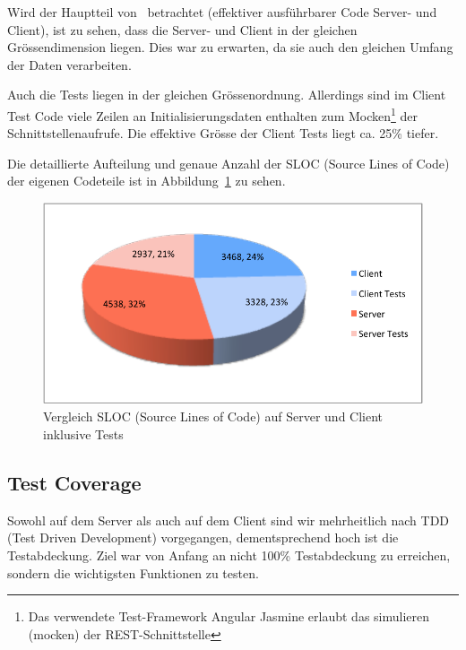 	Wird der Hauptteil von \eeppi\ betrachtet (effektiver ausführbarer Code Server- und Client),
	ist zu sehen, dass die Server- und Client in der gleichen Grössendimension liegen.
	Dies war zu erwarten, da sie auch den gleichen Umfang der Daten verarbeiten.
	
	Auch die Tests liegen in der gleichen Grössenordnung.
	Allerdings sind im Client Test Code viele Zeilen an Initialisierungsdaten enthalten zum Mocken\footnote{Das verwendete Test-Framework Angular Jasmine erlaubt das simulieren (mocken) der REST-Schnittstelle} der Schnittstellenaufrufe. 
	Die effektive Grösse der Client Tests liegt ca. 25\% tiefer.
	
	Die detaillierte Aufteilung und genaue Anzahl der SLOC (Source Lines of Code) der eigenen Codeteile ist in Abbildung\ \ref{fig:serverClientSLOC} zu sehen.
	
	\begin{figure}[H]
		\includegraphics[width=\largeThird\textwidth]{projectPlan/media/img/serverClientSLOC.pdf}
		\centering
		\caption{Vergleich SLOC (Source Lines of Code) auf Server und Client inklusive Tests}
		\label{fig:serverClientSLOC}
	\end{figure}


	\subsection{Test Coverage}
	Sowohl auf dem Server als auch auf dem Client sind wir mehrheitlich nach TDD (Test Driven Development) vorgegangen,
	dementsprechend hoch ist die Testabdeckung.
	Ziel war von Anfang an nicht 100\% Testabdeckung zu erreichen, sondern die wichtigsten Funktionen zu testen.
	
